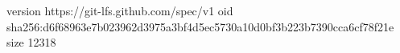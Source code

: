 version https://git-lfs.github.com/spec/v1
oid sha256:d6f68963e7b023962d3975a3bf4d5ec5730a10d0bf3b223b7390cca6cf78f21e
size 12318

